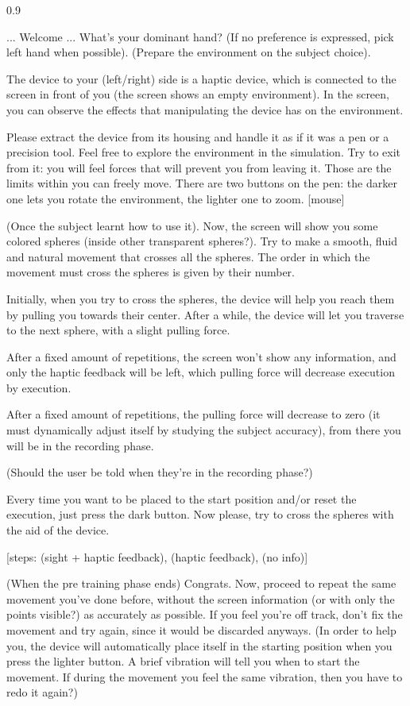 \documentclass[12pt]{report}
\newenvironment{protocol}
{%
  \begin{minipage}{\textwidth}
  \begin{list}{}{%
    \setlength{\leftmargin}{0cm}%
    \setlength{\rightmargin}{0.8cm}%
    \setlength{\listparindent}{0pt}%
    \setlength{\itemindent}{0pt}%
  }
  \item\relax
  \begin{spacing}{0.9}
  \ttfamily\small
  \ignorespaces
}
{%
  \end{spacing}
  \end{list}
  \end{minipage}
}
\begin{document}
\begin{protocol}
... Welcome ... What's your dominant hand? (If no preference is expressed, pick left hand when possible). (Prepare the environment on the subject choice).

The device to your (left/right) side is a haptic device, which is connected to the screen in front of you (the screen shows an empty environment). In the screen, you can observe the effects that manipulating the device has on the environment.

Please extract the device from its housing and handle it as if it was a pen or a precision tool. Feel free to explore the environment in the simulation. Try to exit from it: you will feel forces that will prevent you from leaving it. Those are the limits within you can freely move. There are two buttons on the pen: the darker one lets you rotate the environment, the lighter one to zoom. [mouse]

(Once the subject learnt how to use it). Now, the screen will show you some colored spheres (inside other transparent spheres?). Try to make a smooth, fluid and natural movement that crosses all the spheres. The order in which the movement must cross the spheres is given by their number. 

Initially, when you try to cross the spheres, the device will help you reach them by pulling you towards their center. After a while, the device will let you traverse to the next sphere, with a slight pulling force.

After a fixed amount of repetitions, the screen won’t show any information, and only the haptic feedback will be left, which pulling force will decrease execution by execution.

After a fixed amount of repetitions, the pulling force will decrease to zero (it must dynamically adjust itself by studying the subject accuracy), from there you will be in the recording phase.

(Should the user be told when they're in the recording phase?)

Every time you want to be placed to the start position and/or reset the execution, just press the dark button. Now please, try to cross the spheres with the aid of the device.

[steps: (sight + haptic feedback), (haptic feedback), (no info)]

(When the pre training phase ends) Congrats. Now, proceed to repeat the same movement you've done before, without the screen information (or with only the points visible?) as accurately as possible. If you feel you're off track, don't fix the movement and try again, since it would be discarded anyways. (In order to help you, the device will automatically place itself in the starting position when you press the lighter button. A brief vibration will tell you when to start the movement. If during the movement you feel the same vibration, then you have to redo it again?)
\end{protocol}
\end{document}
